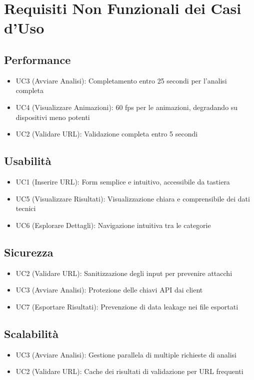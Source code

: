 \section{Requisiti Non Funzionali dei Casi d'Uso}

\subsection{Performance}
\begin{itemize}
    \item UC3 (Avviare Analisi): Completamento entro 25 secondi per l'analisi completa
    \item UC4 (Visualizzare Animazioni): 60 fps per le animazioni, degradando su dispositivi meno potenti
    \item UC2 (Validare URL): Validazione completa entro 5 secondi
\end{itemize}

\subsection{Usabilità}
\begin{itemize}
    \item UC1 (Inserire URL): Form semplice e intuitivo, accessibile da tastiera
    \item UC5 (Visualizzare Risultati): Visualizzazione chiara e comprensibile dei dati tecnici
    \item UC6 (Esplorare Dettagli): Navigazione intuitiva tra le categorie
\end{itemize}

\subsection{Sicurezza}
\begin{itemize}
    \item UC2 (Validare URL): Sanitizzazione degli input per prevenire attacchi
    \item UC3 (Avviare Analisi): Protezione delle chiavi API dai client
    \item UC7 (Esportare Risultati): Prevenzione di data leakage nei file esportati
\end{itemize}

\subsection{Scalabilità}
\begin{itemize}
    \item UC3 (Avviare Analisi): Gestione parallela di multiple richieste di analisi
    \item UC2 (Validare URL): Cache dei risultati di validazione per URL frequenti
\end{itemize}

